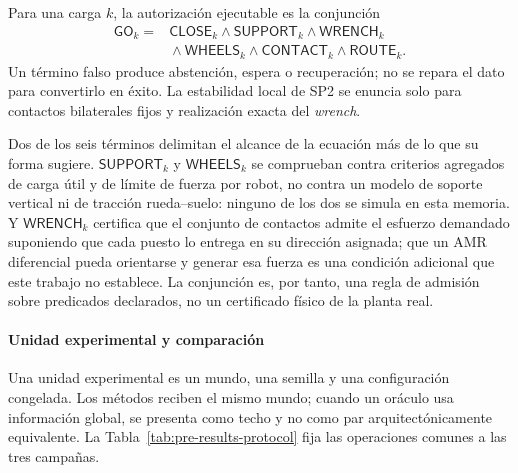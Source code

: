 Para una carga $k$, la autorización ejecutable es la conjunción
\begin{equation}
 \begin{aligned}
 \mathsf{GO}_k={}&\mathsf{CLOSE}_k\land\mathsf{SUPPORT}_k
 \land\mathsf{WRENCH}_k\\
 &{}\land\mathsf{WHEELS}_k\land\mathsf{CONTACT}_k\land\mathsf{ROUTE}_k.
 \end{aligned}
 \label{eq:pre-results-go-contract}
\end{equation}
Un término falso produce abstención, espera o recuperación; no se repara el
dato para convertirlo en éxito. La estabilidad local de SP2 se enuncia solo
para contactos bilaterales fijos y realización exacta del \emph{wrench}.

Dos de los seis términos delimitan el alcance de la ecuación más de lo que su
forma sugiere. $\mathsf{SUPPORT}_k$ y $\mathsf{WHEELS}_k$ se comprueban contra
criterios agregados de carga útil y de límite de fuerza por robot, no contra un
modelo de soporte vertical ni de tracción rueda--suelo: ninguno de los dos se
simula en esta memoria. Y $\mathsf{WRENCH}_k$ certifica que el conjunto de
contactos admite el esfuerzo demandado suponiendo que cada puesto lo entrega en
su dirección asignada; que un AMR diferencial pueda orientarse y generar esa
fuerza es una condición adicional que este trabajo no establece. La conjunción
es, por tanto, una regla de admisión sobre predicados declarados, no un
certificado físico de la planta real.

\clearpage
\paragraph{Unidad experimental y comparación}

Una unidad experimental es un mundo, una semilla y una configuración congelada. Los métodos reciben el mismo mundo; cuando un oráculo usa información global, se presenta como techo y no como par arquitectónicamente equivalente. La Tabla~\ref{tab:pre-results-protocol} fija las operaciones comunes a las tres campañas.

